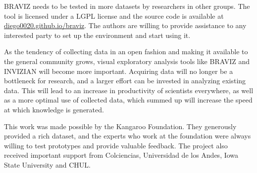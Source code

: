 \documentclass[twocolumn]{svjour3}
\begin{document}
BRAVIZ needs to be tested in more datasets by researchers in other groups. The tool is licensed under a LGPL license and the source code is available at \url{diego0020.github.io/braviz}. The authors are willing to provide assistance to any interested party to set up the environment and start using it. 

As the tendency of collecting data in an open fashion and making it available to the general community grows, visual exploratory analysis tools like BRAVIZ and INVIZIAN will become more important. Acquiring data will no longer be a bottleneck for research, and a larger effort can be invested in analyzing existing data. This will lead to an increase in productivity of scientists everywhere, as well as a more optimal use of collected data, which summed up will increase the speed at which knowledge is generated.

\begin{acknowledgements}

This work was made possible by the Kangaroo Foundation. They generously provided a rich dataset, and the experts who work at the foundation were always willing to test prototypes and provide valuable feedback. The project also received important support from Colciencias, Universidad de los Andes, Iowa State University and CHUL.

\end{acknowledgements}

 

\end{document}
